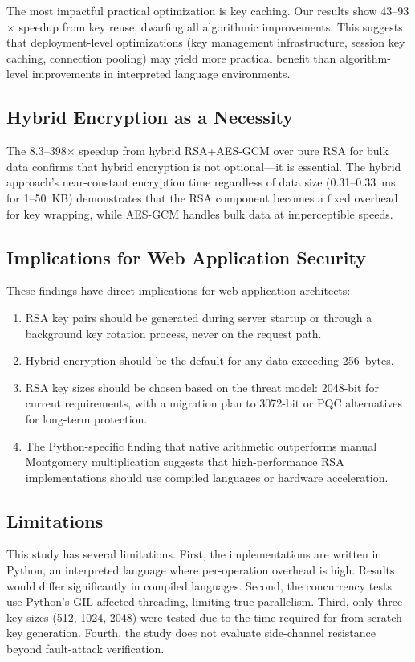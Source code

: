 \documentclass[conference]{IEEEtran}
\begin{document}
The most impactful practical optimization is key caching. Our results show 43--93$\times$ speedup from key reuse, dwarfing all algorithmic improvements. This suggests that deployment-level optimizations (key management infrastructure, session key caching, connection pooling) may yield more practical benefit than algorithm-level improvements in interpreted language environments.

\subsection{Hybrid Encryption as a Necessity}

The 8.3--398$\times$ speedup from hybrid RSA+AES-GCM over pure RSA for bulk data confirms that hybrid encryption is not optional---it is essential. The hybrid approach's near-constant encryption time regardless of data size (0.31--0.33~ms for 1--50~KB) demonstrates that the RSA component becomes a fixed overhead for key wrapping, while AES-GCM handles bulk data at imperceptible speeds.

\subsection{Implications for Web Application Security}

These findings have direct implications for web application architects:
\begin{enumerate}
    \item RSA key pairs should be generated during server startup or through a background key rotation process, never on the request path.
    \item Hybrid encryption should be the default for any data exceeding 256~bytes.
    \item RSA key sizes should be chosen based on the threat model: 2048-bit for current requirements, with a migration plan to 3072-bit or PQC alternatives for long-term protection.
    \item The Python-specific finding that native arithmetic outperforms manual Montgomery multiplication suggests that high-performance RSA implementations should use compiled languages or hardware acceleration.
\end{enumerate}

\subsection{Limitations}

This study has several limitations. First, the implementations are written in Python, an interpreted language where per-operation overhead is high. Results would differ significantly in compiled languages. Second, the concurrency tests use Python's GIL-affected threading, limiting true parallelism. Third, only three key sizes (512, 1024, 2048) were tested due to the time required for from-scratch key generation. Fourth, the study does not evaluate side-channel resistance beyond fault-attack verification.
\end{document}
